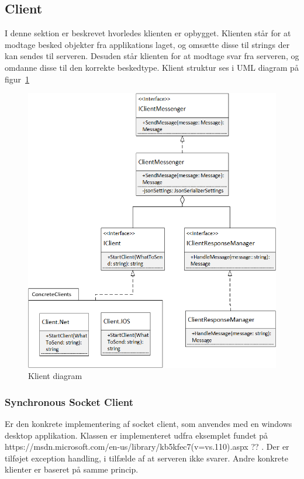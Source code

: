 \subsection{Client}
I denne sektion er beskrevet hvorledes klienten er opbygget. Klienten står for at modtage besked objekter fra applikations laget, og omsætte disse til strings der kan sendes til serveren. Desuden står klienten for at modtage svar fra serveren, og omdanne disse til den korrekte beskedtype. Klient struktur ses i UML diagram på figur~\ref{fig:Connection.Client}

\begin{figure}
	\centering
	\includegraphics[width=0.9\linewidth]{figs/connection/Connection.Client.png}
	\caption{Klient diagram}
	\label{fig:Connection.Client}
\end{figure}

\subsubsection{Synchronous Socket Client}
Er den konkrete implementering af socket client, som anvendes med en windows desktop applikation. Klassen er implementeret udfra eksemplet fundet på https://msdn.microsoft.com/en-us/library/kb5kfec7(v=vs.110).aspx ?? . Der er tilføjet exception handling, i tilfælde af at serveren ikke svarer. Andre konkrete klienter er baseret på samme princip.

